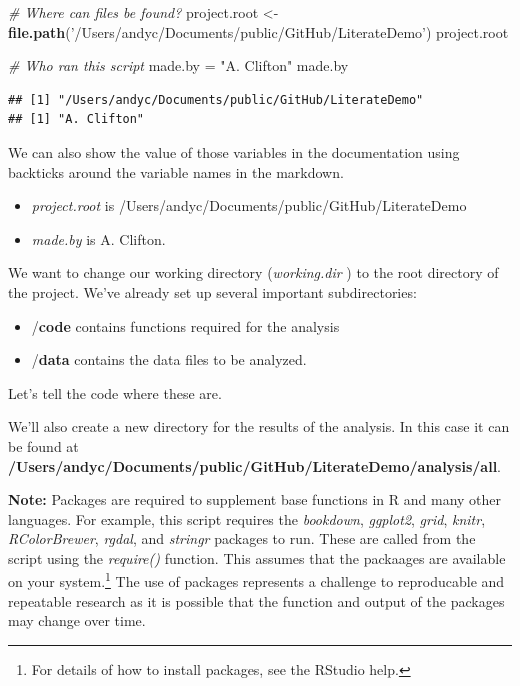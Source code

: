 \documentclass[10pt,]{article}
\newenvironment{Shaded}{\begin{snugshade}}{\end{snugshade}}
\newcommand{\CommentTok}[1]{\textcolor[rgb]{0.56,0.35,0.01}{\textit{#1}}}
\newcommand{\KeywordTok}[1]{\textcolor[rgb]{0.13,0.29,0.53}{\textbf{#1}}}
\newcommand{\NormalTok}[1]{#1}
\newcommand{\StringTok}[1]{\textcolor[rgb]{0.31,0.60,0.02}{#1}}
\providecommand{\tightlist}{%
  \setlength{\itemsep}{0pt}\setlength{\parskip}{0pt}}
\let\rmarkdownfootnote\footnote%
\def\footnote{\protect\rmarkdownfootnote}
\begin{document}
\begin{Shaded}
\begin{Highlighting}[]
\CommentTok{# Where can files be found?}
\NormalTok{project.root <-}\StringTok{ }\KeywordTok{file.path}\NormalTok{(}\StringTok{'/Users/andyc/Documents/public/GitHub/LiterateDemo'}\NormalTok{)}
\NormalTok{project.root}

\CommentTok{# Who ran this script}
\NormalTok{made.by =}\StringTok{ "A. Clifton"}
\NormalTok{made.by}
\end{Highlighting}
\end{Shaded}

\begin{verbatim}
## [1] "/Users/andyc/Documents/public/GitHub/LiterateDemo"
## [1] "A. Clifton"
\end{verbatim}

We can also show the value of those variables in the documentation using backticks around the variable names in the markdown.

\begin{itemize}
\tightlist
\item
  \emph{project.root} is /Users/andyc/Documents/public/GitHub/LiterateDemo
\item
  \emph{made.by} is A. Clifton.
\end{itemize}

We want to change our working directory (\emph{working.dir} ) to the root directory of the project. We've already set up several important subdirectories:

\begin{itemize}
\tightlist
\item
  /\textbf{code} contains functions required for the analysis
\item
  /\textbf{data} contains the data files to be analyzed.
\end{itemize}

Let's tell the code where these are.

We'll also create a new directory for the results of the analysis. In this case it can be found at \textbf{/Users/andyc/Documents/public/GitHub/LiterateDemo/analysis/all}.

\textbf{Note:} Packages are required to supplement base functions in R and many other languages. For example, this script requires the \emph{bookdown}, \emph{ggplot2}, \emph{grid}, \emph{knitr}, \emph{RColorBrewer}, \emph{rgdal}, and \emph{stringr} packages to run. These are called from the script using the \emph{require()} function. This assumes that the packaages are available on your system.\footnote{For details of how to install packages, see the RStudio help.} The use of packages represents a challenge to reproducable and repeatable research as it is possible that the function and output of the packages may change over time.
\end{document}
